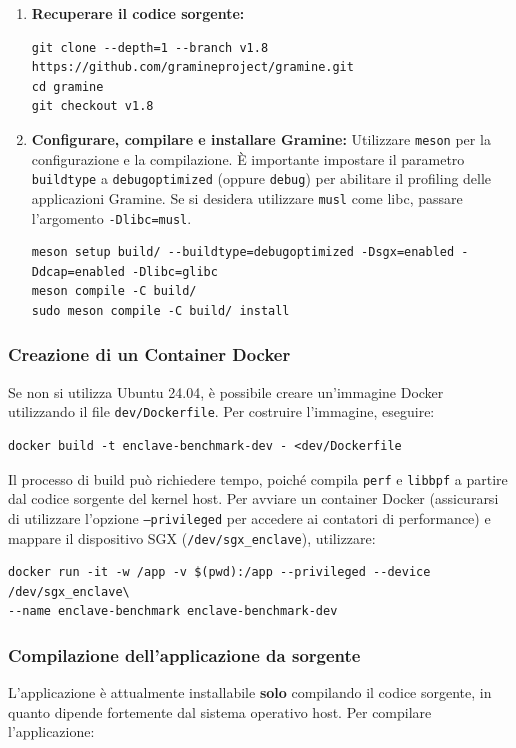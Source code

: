 \documentclass{article}
\begin{document}
\begin{enumerate}
  \item \textbf{Recuperare il codice sorgente:}
  \begin{verbatim}
git clone --depth=1 --branch v1.8 https://github.com/gramineproject/gramine.git
cd gramine
git checkout v1.8
  \end{verbatim}

  \item \textbf{Configurare, compilare e installare Gramine:} Utilizzare \texttt{meson} per la configurazione e la compilazione. È importante impostare il parametro \texttt{buildtype} a \texttt{debugoptimized} (oppure \texttt{debug}) per abilitare il profiling delle applicazioni Gramine. Se si desidera utilizzare \texttt{musl} come libc, passare l'argomento \texttt{-Dlibc=musl}.
  \begin{verbatim}
meson setup build/ --buildtype=debugoptimized -Dsgx=enabled -Ddcap=enabled -Dlibc=glibc
meson compile -C build/
sudo meson compile -C build/ install
  \end{verbatim}
\end{enumerate}

\subsubsection{Creazione di un Container Docker}
Se non si utilizza Ubuntu 24.04, è possibile creare un'immagine Docker utilizzando il file \texttt{dev/Dockerfile}. Per costruire l'immagine, eseguire:
\begin{verbatim}
docker build -t enclave-benchmark-dev - <dev/Dockerfile
\end{verbatim}
Il processo di build può richiedere tempo, poiché compila \texttt{perf} e \texttt{libbpf} a partire dal codice sorgente del kernel host. Per avviare un container Docker (assicurarsi di utilizzare l'opzione \texttt{--privileged} per accedere ai contatori di performance) e mappare il dispositivo SGX (\texttt{/dev/sgx\_enclave}), utilizzare:
\begin{verbatim}
docker run -it -w /app -v $(pwd):/app --privileged --device /dev/sgx_enclave\
--name enclave-benchmark enclave-benchmark-dev
\end{verbatim}

\subsubsection{Compilazione dell'applicazione da sorgente}
L'applicazione è attualmente installabile \textbf{solo} compilando il codice sorgente, in quanto dipende fortemente dal sistema operativo host. Per compilare l'applicazione:
\end{document}
